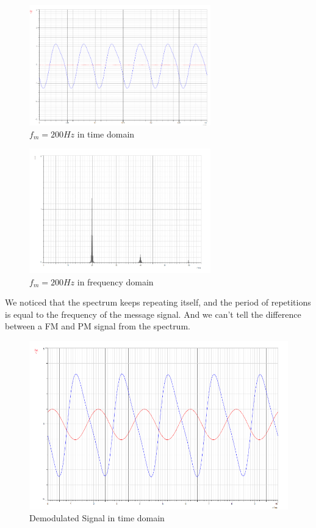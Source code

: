 \documentclass[12pt]{article}
\begin{document}
\begin{figure}[H]
    \centering
    \includegraphics[width=0.7\textwidth]{assets/p2.png}
    \caption{$f_m = 200Hz$ in time domain}
\end{figure}
\begin{figure}[H]
    \centering
    \includegraphics[width=0.7\textwidth]{assets/p4.png}
    \caption{$f_m = 200Hz$ in frequency domain}
\end{figure}
We noticed that the spectrum keeps repeating itself, and the period of repetitions is equal to the frequency of the message signal. And we can't tell the difference between a FM and PM signal from the spectrum.
\begin{figure}[H]
    \centering
    \includegraphics[width=1\textwidth]{assets/p5.png}
    \caption{Demodulated Signal in time domain}
\end{figure}
\end{document}
